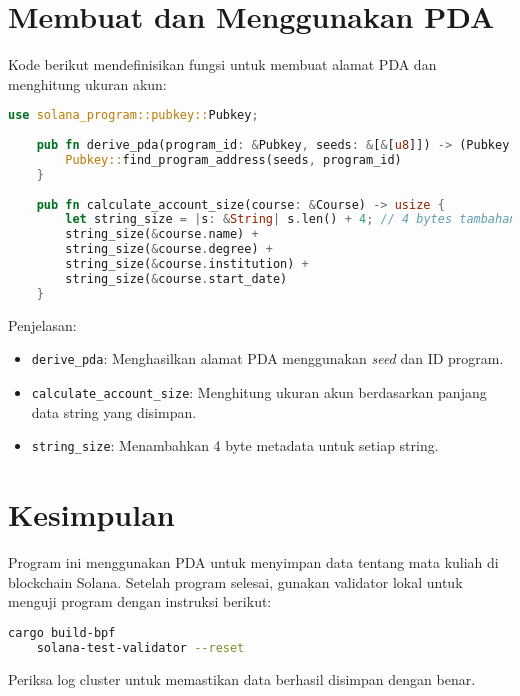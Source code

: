 \section{Membuat dan Menggunakan PDA}
Kode berikut mendefinisikan fungsi untuk membuat alamat PDA dan menghitung ukuran akun:

\begin{lstlisting}[language=Rust]
	use solana_program::pubkey::Pubkey;
	
	pub fn derive_pda(program_id: &Pubkey, seeds: &[&[u8]]) -> (Pubkey, u8) {
		Pubkey::find_program_address(seeds, program_id)
	}
	
	pub fn calculate_account_size(course: &Course) -> usize {
		let string_size = |s: &String| s.len() + 4; // 4 bytes tambahan untuk metadata
		string_size(&course.name) +
		string_size(&course.degree) +
		string_size(&course.institution) +
		string_size(&course.start_date)
	}
\end{lstlisting}

Penjelasan:
\begin{itemize}
	\item \texttt{derive\_pda}: Menghasilkan alamat PDA menggunakan \textit{seed} dan ID program.
	\item \texttt{calculate\_account\_size}: Menghitung ukuran akun berdasarkan panjang data string yang disimpan.
	\item \texttt{string\_size}: Menambahkan 4 byte metadata untuk setiap string.
\end{itemize}

\section{Kesimpulan}
Program ini menggunakan PDA untuk menyimpan data tentang mata kuliah di blockchain Solana. Setelah program selesai, gunakan validator lokal untuk menguji program dengan instruksi berikut:

\begin{lstlisting}[language=bash]
	cargo build-bpf
	solana-test-validator --reset
\end{lstlisting}

Periksa log cluster untuk memastikan data berhasil disimpan dengan benar.
